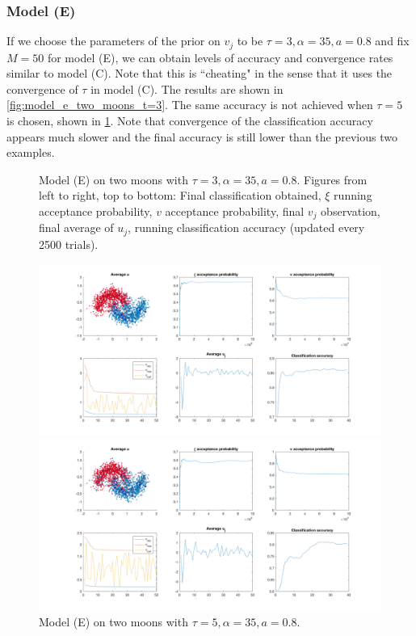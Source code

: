 \documentclass{siamart1116}
\begin{document}
        \subsubsection{Model (E)}
            If we choose the parameters of the prior on $v_j$ to be $\tau = 3, \alpha = 35, a=0.8$ and fix $M=50$ for model (E), we can obtain levels of accuracy and convergence rates similar to model (C). Note that this is ``cheating" in the sense that it uses the convergence of $\tau$ in model (C). The results are shown in \cref{fig:model_e_two_moons_t=3}. The same accuracy is not achieved when $\tau=5$ is chosen, shown in \cref{fig:model_e_two_moons_t=5}. Note that convergence of the classification accuracy appears much slower and the final accuracy is still lower than the previous two examples.
            \begin{figure}[!htb]
                \begin{minipage}{0.48\linewidth}
                \centering
                \caption{\label{fig:model_e_two_moons_t=3}Model (E) on two moons with $\tau=3,\alpha=35,a=0.8$. Figures from left to right, top to bottom: Final classification obtained, $\xi$ running acceptance probability, $v$ acceptance probability, final $v_j$ observation, final average of $u_j$, running classification accuracy (updated every 2500 trials).}
                \includegraphics[width=0.8\linewidth]{model_c_vs_model_e/moons/learn_v/t=3.png}
                \end{minipage}\hfill
                \begin{minipage}{0.48\linewidth}
                \centering
                \caption{\label{fig:model_e_two_moons_t=5}Model (E) on two moons with $\tau=5,\alpha=35,a=0.8$.}
                \includegraphics[width=0.8\linewidth]{model_c_vs_model_e/moons/learn_v/t=5.png}
                \end{minipage}
            \end{figure}
\end{document}
